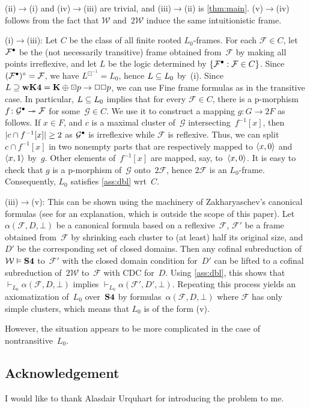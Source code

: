 \documentclass[leqno,draft,11pt]{article}
\def\bdi#1{#1^{\boxdot^{-1}}}
\let\frm\mathcal
\begin{document}
\begin{Pf}[sketch]
(ii)${}\to{}$(i) and (iv)${}\to{}$(iii) are trivial, and
(iii)${}\to{}$(ii) is \th\ref{thm:main}. (v)${}\to{}$(iv) follows from
the fact that $\frm W$ and~$2\frm W$ induce the same intuitionistic
frame.

(i)${}\to{}$(iii): Let $C$ be the class of all finite rooted $L_0$-frames.
For each $\frm F\in C$, let $\frm F^\I$ be the (not necessarily
transitive) frame obtained from~$\frm F$ by making all points
irreflexive, and let $L$ be the logic determined by $\{\frm F^\I:\frm
F\in C\}$. Since $(\frm F^\I)^\R=\frm F$, we have $\bdi L=L_0$, hence
$L\subseteq L_0$ by~(i). Since $L\Sset\lgc{wK4}=\lgc K\oplus\boxdot
p\to\Box\Box p$, we can use Fine frame formulas as in the transitive
case. In particular, $L\subseteq L_0$ implies that for every $\frm F\in
C$, there is a p-morphism $f\colon\frm G^\I\onto\frm F$ for some~$\frm
G\in C$. We use it to construct a mapping $g\colon G\to2F$ as
follows. If $x\in F$, and $c$ is a maximal cluster of~$\frm G$
intersecting~$f^{-1}[x]$, then $\lvert c\cap f^{-1}[x]\rvert\ge2$ as $\frm
G^\I$ is irreflexive while $\frm F$ is reflexive. Thus, we can split
$c\cap f^{-1}[x]$ in two nonempty parts that are respectively mapped to
$\langle x,0\rangle$ and~$\langle x,1\rangle$ by~$g$. Other elements of~$f^{-1}[x]$ are
mapped, say, to~$\langle x,0\rangle$. It is easy to check that $g$ is a
p-morphism of~$\frm G$ onto~$2\frm F$, hence $2\frm F$ is an
$L_0$-frame. Consequently, $L_0$ satisfies \th\ref{ass:dbl} wrt~$C$.

(iii)${}\to{}$(v): This can be shown using the machinery of
Zakharyaschev's canonical formulas (see \cite[\S9]{cha-zax} for an
explanation, which is outside the scope of this paper). Let
$\alpha(\frm F,D,\bot)$ be a canonical formula based
on a reflexive~$\frm F$, $\frm F'$ be a frame obtained from~$\frm F$ by
shrinking each cluster to (at least) half its original size, and $D'$
be the corresponding set of closed domains. Then any cofinal subreduction
of~$\frm W\model\lgc{S4}$ to~$\frm F'$ with the closed domain
condition for~$D'$ can be lifted to a cofinal subreduction of~$2\frm W$
to~$\frm F$ with CDC for~$D$. Using \th\ref{ass:dbl}, this shows that
$\vdash_{L_0}\alpha(\frm F,D,\bot)$ implies $\vdash_{L_0}\alpha(\frm
F',D',\bot)$. Repeating this process yields an axiomatization of~$L_0$ over~$\mathbf{S4}$ by formulas~$\alpha(\frm F,D,\bot)$ where
$\frm F$ has only simple clusters, which means that $L_0$ is of the
form (v).
\end{Pf}
However, the situation appears to be more complicated in the case of
nontransitive~$L_0$.

\subsection*{Acknowledgement}
I would like to thank Alasdair Urquhart for introducing the problem to
me.



\end{document}
